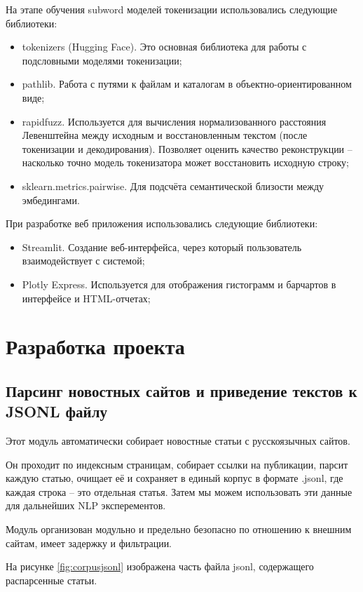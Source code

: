 \documentclass[a4paper,article]{article}
\theoremstyle{mystyle}
\newcommand{\mystyleitemize}[1]{
  \begin{itemize}[label=--, 
				leftmargin=0pt,%
    				labelindent=\parindent,%
    				labelsep=1cm,%
    				itemindent=*,%
    				nolistsep%
    				]
    #1
  \end{itemize}
}
\begin{document}
\begin{sloppypar}
		На этапе обучения subword моделей токенизации использовались следующие библиотеки:
		
		\mystyleitemize{
    			\item tokenizers (Hugging Face). Это основная библиотека для работы с подсловными моделями токенизации;
    			\item pathlib. Работа с путями к файлам и каталогам в объектно-ориентированном виде;
    			\item rapidfuzz. Используется для вычисления нормализованного расстояния Левенштейна между исходным и восстановленным текстом (после токенизации и декодирования).
Позволяет оценить качество реконструкции -- насколько точно модель токенизатора может восстановить исходную строку;
    			\item sklearn.metrics.pairwise. Для подсчёта семантической близости между эмбедингами.
		}
		
		При разработке веб приложения использовались следующие библиотеки:
		
		\mystyleitemize{
    			\item Streamlit. Создание веб-интерфейса, через который пользователь взаимодействует с системой;
    			\item Plotly Express. Используется для отображения гистограмм и барчартов в интерфейсе и HTML-отчетах;
		}
		
	\section{Разработка проекта}
	
		\subsection{Парсинг новостных сайтов и приведение текстов к JSONL файлу}
		
			Этот модуль автоматически собирает новостные статьи с русскоязычных сайтов.
			
			Он проходит по индексным страницам, собирает ссылки на публикации, парсит каждую статью, очищает её и сохраняет в единый корпус в формате .jsonl, где каждая строка -- это отдельная статья. Затем мы можем использовать эти данные для дальнейших NLP эксперементов.
			
			Модуль организован модульно и предельно безопасно по отношению к внешним сайтам, имеет задержку и фильтрации.
			
			На рисунке \ref{fig:corpusjsonl} изображена часть файла jsonl, содержащего распарсенные статьи.
			

\end{sloppypar}
\end{document}
